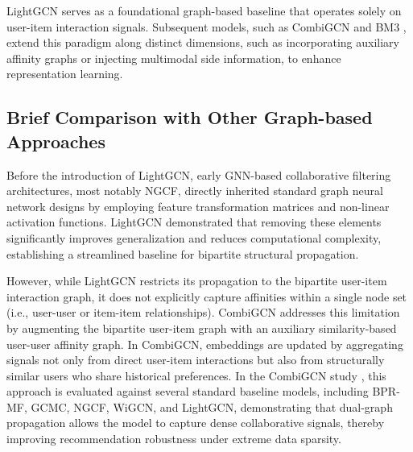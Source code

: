 LightGCN serves as a foundational graph-based baseline that operates solely on user-item interaction signals. Subsequent models, such as CombiGCN \parencite{10.1007/978-981-97-0669-3_11} and BM3 \parencite{10.1145/3543507.3583251}, extend this paradigm along distinct dimensions, such as incorporating auxiliary affinity graphs or injecting multimodal side information, to enhance representation learning.


\subsection{Brief Comparison with Other Graph-based Approaches}

Before the introduction of LightGCN, early GNN-based collaborative filtering architectures, most notably NGCF, directly inherited standard graph neural network designs by employing feature transformation matrices and non-linear activation functions. LightGCN demonstrated that removing these elements significantly improves generalization and reduces computational complexity, establishing a streamlined baseline for bipartite structural propagation.

However, while LightGCN restricts its propagation to the bipartite user-item interaction graph, it does not explicitly capture affinities within a single node set (i.e., user-user or item-item relationships). CombiGCN \parencite{10.1007/978-981-97-0669-3_11} addresses this limitation by augmenting the bipartite user-item graph with an auxiliary similarity-based user-user affinity graph. In CombiGCN, embeddings are updated by aggregating signals not only from direct user-item interactions but also from structurally similar users who share historical preferences. In the CombiGCN study \parencite{10.1007/978-981-97-0669-3_11}, this approach is evaluated against several standard baseline models, including BPR-MF, GCMC, NGCF, WiGCN, and LightGCN, demonstrating that dual-graph propagation allows the model to capture dense collaborative signals, thereby improving recommendation robustness under extreme data sparsity.
